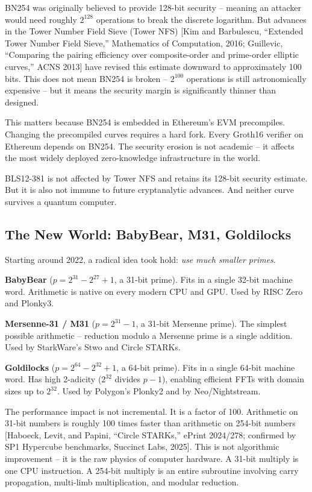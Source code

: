 \documentclass[
  11pt,
  openany]{report}
\renewcommand{\textbf}[1]{{\bfseries\color{MidnightBold}#1}}
\begin{document}
BN254 was originally believed to provide 128-bit security -- meaning an attacker
would need roughly \(2^{128}\) operations to break the discrete logarithm. But
advances in the Tower Number Field Sieve (Tower NFS) {[}Kim and Barbulescu,
``Extended Tower Number Field Sieve,'' Mathematics of Computation, 2016;
Guillevic, ``Comparing the pairing efficiency over composite-order and
prime-order elliptic curves,'' ACNS 2013{]} have revised this estimate downward
to approximately 100 bits. This does not mean BN254 is broken -- \(2^{100}\)
operations is still astronomically expensive -- but it means the security margin
is significantly thinner than designed.

This matters because BN254 is embedded in Ethereum's EVM precompiles. Changing
the precompiled curves requires a hard fork. Every Groth16 verifier on Ethereum
depends on BN254. The security erosion is not academic -- it affects the most
widely deployed zero-knowledge infrastructure in the world.

BLS12-381 is not affected by Tower NFS and retains its 128-bit security
estimate. But it is also not immune to future cryptanalytic advances. And
neither curve survives a quantum computer.

\subsection{The New World: BabyBear, M31,
Goldilocks}\label{the-new-world-babybear-m31-goldilocks}

Starting around 2022, a radical idea took hold: \emph{use much smaller primes}.

\textbf{BabyBear} (\(p = 2^{31} - 2^{27} + 1\), a 31-bit prime). Fits in a
single 32-bit machine word. Arithmetic is native on every modern CPU and GPU.
Used by RISC Zero and Plonky3.

\textbf{Mersenne-31 / M31} (\(p = 2^{31} - 1\), a 31-bit Mersenne prime). The
simplest possible arithmetic -- reduction modulo a Mersenne prime is a single
addition. Used by StarkWare's Stwo and Circle STARKs.

\textbf{Goldilocks} (\(p = 2^{64} - 2^{32} + 1\), a 64-bit prime). Fits in a
single 64-bit machine word. Has high 2-adicity (\(2^{32}\) divides \(p - 1\)),
enabling efficient FFTs with domain sizes up to \(2^{32}\). Used by Polygon's
Plonky2 and by Neo/Nightstream.

The performance impact is not incremental. It is a factor of 100. Arithmetic on
31-bit numbers is roughly 100 times faster than arithmetic on 254-bit numbers
{[}Haboeck, Levit, and Papini, ``Circle STARKs,'' ePrint 2024/278; confirmed by
SP1 Hypercube benchmarks, Succinct Labs, 2025{]}. This is not algorithmic
improvement -- it is the raw physics of computer hardware. A 31-bit multiply is
one CPU instruction. A 254-bit multiply is an entire subroutine involving carry
propagation, multi-limb multiplication, and modular reduction.
\end{document}
